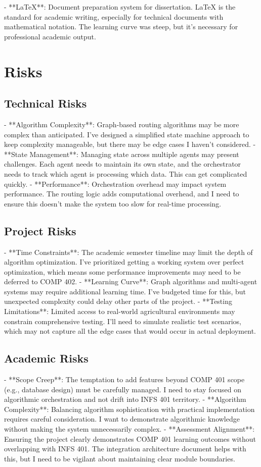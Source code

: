 - **LaTeX**: Document preparation system for dissertation. LaTeX is the standard for academic writing, especially for technical documents with mathematical notation. The learning curve was steep, but it's necessary for professional academic output.

\section{Risks}

\subsection{Technical Risks}
- **Algorithm Complexity**: Graph-based routing algorithms may be more complex than anticipated. I've designed a simplified state machine approach to keep complexity manageable, but there may be edge cases I haven't considered.
- **State Management**: Managing state across multiple agents may present challenges. Each agent needs to maintain its own state, and the orchestrator needs to track which agent is processing which data. This can get complicated quickly.
- **Performance**: Orchestration overhead may impact system performance. The routing logic adds computational overhead, and I need to ensure this doesn't make the system too slow for real-time processing.

\subsection{Project Risks}
- **Time Constraints**: The academic semester timeline may limit the depth of algorithm optimization. I've prioritized getting a working system over perfect optimization, which means some performance improvements may need to be deferred to COMP 402.
- **Learning Curve**: Graph algorithms and multi-agent systems may require additional learning time. I've budgeted time for this, but unexpected complexity could delay other parts of the project.
- **Testing Limitations**: Limited access to real-world agricultural environments may constrain comprehensive testing. I'll need to simulate realistic test scenarios, which may not capture all the edge cases that would occur in actual deployment.

\subsection{Academic Risks}
- **Scope Creep**: The temptation to add features beyond COMP 401 scope (e.g., database design) must be carefully managed. I need to stay focused on algorithmic orchestration and not drift into INFS 401 territory.
- **Algorithm Complexity**: Balancing algorithm sophistication with practical implementation requires careful consideration. I want to demonstrate algorithmic knowledge without making the system unnecessarily complex.
- **Assessment Alignment**: Ensuring the project clearly demonstrates COMP 401 learning outcomes without overlapping with INFS 401. The integration architecture document helps with this, but I need to be vigilant about maintaining clear module boundaries.

